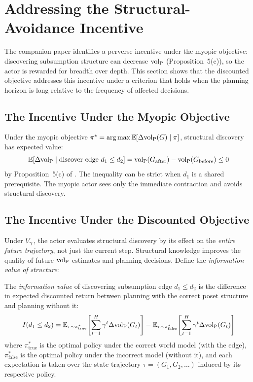 \section{Addressing the Structural-Avoidance Incentive}
\label{sec:avoidance}

The companion paper \citep{lasser2026poset} identifies a perverse incentive
under the myopic objective: discovering subsumption structure can decrease
${\operatorname{vol}_{\mathrm{P}}}$ (Proposition~5(c)), so the actor is rewarded for breadth over depth.
This section shows that the discounted objective addresses this incentive
under a criterion that holds when the planning horizon is long relative to
the frequency of affected decisions.

\subsection{The Incentive Under the Myopic Objective}

Under the myopic objective $\pi^* = \arg\max \mathbb{E}[\Delta {\operatorname{vol}_{\mathrm{P}}}(G) \mid
\pi]$, structural discovery has expected value:
\begin{equation}
\label{eq:myopic_structure}
\mathbb{E}[\Delta {\operatorname{vol}_{\mathrm{P}}} \mid \text{discover edge } d_1 \leq d_2]
= {\operatorname{vol}_{\mathrm{P}}}(G_{\text{after}}) - {\operatorname{vol}_{\mathrm{P}}}(G_{\text{before}})
\leq 0
\end{equation}
by Proposition~5(c) of \citet{lasser2026poset}. The inequality can be strict
when $d_1$ is a shared prerequisite. The myopic actor sees only the immediate
contraction and avoids structural discovery.

\subsection{The Incentive Under the Discounted Objective}

Under $V_\gamma$, the actor evaluates structural discovery by its effect on the
\emph{entire future trajectory}, not just the current step. Structural
knowledge improves the quality of future ${\operatorname{vol}_{\mathrm{P}}}$ estimates and planning
decisions. Define the \emph{information value of structure}:

\begin{definition}
\label{def:info_value}
The \emph{information value} of discovering subsumption edge $d_1 \leq d_2$
    is the difference in expected discounted return between planning with the
    correct poset structure and planning without it:
\begin{equation}
\label{eq:info_value}
I(d_1 \leq d_2) = \mathbb{E}_{\tau \sim \pi^*_{\text{true}}}\!\left[
    \sum_{t=1}^{H} \gamma^t \Delta {\operatorname{vol}_{\mathrm{P}}}(G_t)
\right]
- \mathbb{E}_{\tau \sim \pi^*_{\text{false}}}\!\left[
    \sum_{t=1}^{H} \gamma^t \Delta {\operatorname{vol}_{\mathrm{P}}}(G_t)
\right]
\end{equation}
where $\pi^*_{\text{true}}$ is the optimal policy under the correct world
    model (with the edge), $\pi^*_{\text{false}}$ is the optimal policy under
    the incorrect model (without it), and each expectation is taken over the
    state trajectory $\tau = (G_1, G_2, \ldots)$ induced by its respective
    policy.
\end{definition}

